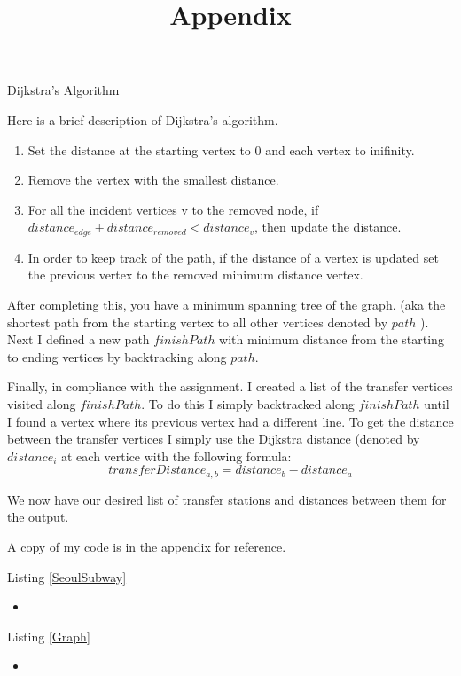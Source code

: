 \documentclass{article}
\newcommand{\javascript}[2]{
\begin{itemize}
\item[]
\end{itemize}
}
\begin{document}
\begin{center} Dijkstra's Algorithm  \end{center}
Here is a brief description of Dijkstra's algorithm.
\begin{enumerate}
	\item Set the distance at the starting vertex to 0 and each vertex to inifinity.
	\item Remove the vertex with the smallest distance.
	\item For all the incident vertices  v to the removed node, if $distance_{edge} + distance_{removed} < distance_v$, 				then update the distance.
	\item In order to keep track of the path, if the distance of a vertex is updated set the previous vertex to the removed minimum 
		distance vertex.
\end{enumerate}

After completing this, you have a minimum spanning tree of the graph. (aka the shortest path from the starting vertex to all other vertices denoted by $path$ ). Next I defined a new path $finishPath$ with minimum distance from the starting to ending vertices by backtracking along $path$.

Finally, in compliance with the assignment. I created a list of the transfer vertices visited along $finishPath$. To do this I simply backtracked along $finishPath$ until I found a vertex where its previous vertex had a different line. To get the distance between the transfer vertices I simply use the Dijkstra distance (denoted by $distance_{i}$ at each vertice with the following formula:
$$ transferDistance_{a,b} = distance_{b} - distance_{a}$$

We now have our desired list of transfer stations and distances between them for the output.

A copy of my code is in the appendix for reference.

\clearpage
\title{
\textmd{\textbf{Appendix}}
}
\newline


Listing \ref{SeoulSubway}
\javascript{SeoulSubway}{SeoulSubway}

Listing \ref{Graph}
\javascript{Graph}{Graph}


\end{document}
